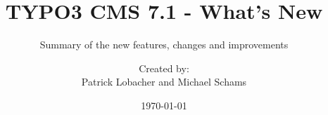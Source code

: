 %

%
%

\documentclass[t]{beamer}

\beamertemplatenavigationsymbolsempty

{
	\usetheme{typo3slides}
}

\title{TYPO3 CMS 7.1 - What's New}
\subtitle{Summary of the new features, changes and improvements}
\author{
	\centerline{Created by:}
	\centerline{Patrick Lobacher and Michael Schams}
}

\date{\today}



\sharefont


\begingroup
	[default]
	\begin{frame}
		\titlepage
	\end{frame}
\endgroup


\section*{TYPO3 CMS 7.1 - What's New}
\begin{frame}[fragile]
	\frametitle{Chapter Overview}
	\framesubtitle{Chapter Overview}

	\begin{multicols}{2}
		\tableofcontents
	\end{multicols}

\end{frame}

